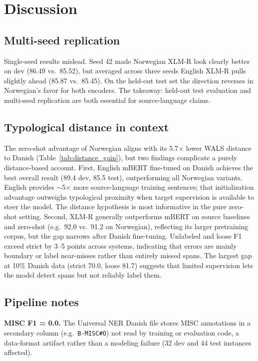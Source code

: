 \section{Discussion}
\label{sec:discussion}

\subsection{Multi-seed replication}

Single-seed results mislead. Seed 42 made Norwegian XLM-R look clearly better on dev (86.49 vs.\ 85.52), but averaged across three seeds English XLM-R pulls slightly ahead (85.87 vs.\ 85.45). On the held-out test set the direction reverses in Norwegian's favor for both encoders. The takeaway: held-out test evaluation and multi-seed replication are both essential for source-language claims.

\subsection{Typological distance in context}

The zero-shot advantage of Norwegian aligns with its 5.7$\times$ lower WALS distance to Danish (Table~\ref{tab:distance_gain}), but two findings complicate a purely distance-based account. First, English mBERT fine-tuned on Danish achieves the best overall result (89.4 dev, 85.5 test), outperforming all Norwegian variants. English provides $\sim$5$\times$ more source-language training sentences; that initialization advantage outweighs typological proximity when target supervision is available to steer the model. The distance hypothesis is most informative in the pure zero-shot setting. Second, XLM-R generally outperforms mBERT on source baselines and zero-shot (e.g.\ 92.0 vs.\ 91.2 on Norwegian), reflecting its larger pretraining corpus, but the gap narrows after Danish fine-tuning. Unlabeled and loose F1 exceed strict by 3--5 points across systems, indicating that errors are mainly boundary or label near-misses rather than entirely missed spans. The largest gap at 10\% Danish data (strict 70.0, loose 81.7) suggests that limited supervision lets the model detect spans but not reliably label them.

\subsection{Pipeline notes}
\label{sec:analysis}

\textbf{MISC F1 = 0.0.} The Universal NER Danish file stores MISC annotations in a secondary column (e.g.\ \texttt{B-MISC\#O}) not read by training or evaluation code, a data-format artifact rather than a modeling failure (32 dev and 44 test instances affected).

